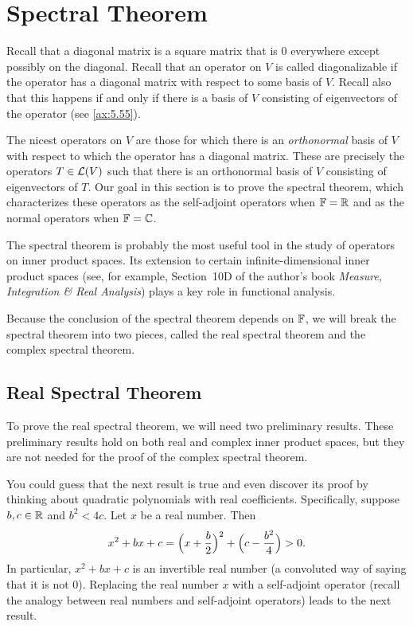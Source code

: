 \DeclareRobustCommand\axeqstep[1]{\refstepcounter{theorem}\label{#1}}
\section{Spectral Theorem}

Recall that a diagonal matrix is a square matrix that is $0$ everywhere except
possibly on the diagonal. Recall that an operator on $V$ is called
diagonalizable if the operator has a diagonal matrix with respect to some basis
of $V$. Recall also that this happens if and only if there is a basis of $V$
consisting of eigenvectors of the operator (see \ref{ax:5.55}).

The nicest operators on $V$ are those for which there is an \emph{orthonormal}
basis of $V$ with respect to which the operator has a diagonal matrix. These are
precisely the operators $T\in\mathcal{L}(V)$ such that there is an orthonormal basis of
$V$ consisting of eigenvectors of $T$. Our goal in this section is to prove the
spectral theorem, which characterizes these operators as the self-adjoint
operators when $\mathbb{F}=\mathbb{R}$ and as the normal operators when $\mathbb{F}=\mathbb{C}$.

The spectral theorem is probably the most useful tool in the study of operators
on inner product spaces. Its extension to certain infinite-dimensional inner
product spaces (see, for example, Section~10D of the author's book
\emph{Measure, Integration \& Real Analysis}) plays a key role in functional
analysis.

Because the conclusion of the spectral theorem depends on $\mathbb{F}$, we will break
the spectral theorem into two pieces, called the real spectral theorem and the
complex spectral theorem.

\subsection{Real Spectral Theorem}

To prove the real spectral theorem, we will need two preliminary results. These
preliminary results hold on both real and complex inner product spaces, but
they are not needed for the proof of the complex spectral theorem.

%
You could guess that the next result is true and even discover its proof by
thinking about quadratic polynomials with real coefficients. Specifically,
suppose $b,c\in\mathbb{R}$ and $b^2<4c$. Let $x$ be a real number. Then
\[ x^2+bx+c = \Bigl(x+\frac{b}{2}\Bigr)^2+\Bigl(c-\frac{b^2}{4}\Bigr) > 0. \]
In particular, $x^2+bx+c$ is an invertible real number (a convoluted way of
saying that it is not $0$). Replacing the real number $x$ with a self-adjoint
operator (recall the analogy between real numbers and self-adjoint operators)
leads to the next result.

